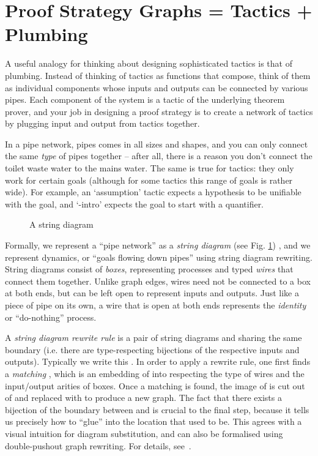 \documentclass{llncs}
\begin{document}
\beforesection
\section{Proof Strategy Graphs = Tactics + Plumbing}\label{sec:psgraph}
\aftersection

A useful analogy for thinking about designing sophisticated tactics is that of plumbing. Instead of thinking of tactics as functions that compose, think of them as individual components whose inputs and outputs can be connected by various pipes. Each component of the system is a tactic of the underlying theorem prover, and your job in designing a proof strategy is to create a network of tactics by plugging input and output from tactics together.

In a pipe network, pipes comes in all sizes and shapes, and you can only connect the same \emph{type} of pipes together -- after all, there is a reason you don't connect the toilet waste water to the mains water. The same is true for tactics: they only work for certain goals (although for some tactics this range of goals is rather wide). For example, an `assumption' tactic expects a hypothesis to be unifiable with the goal, and `-intro' expects the goal to start with a  quantifier. 

\begin{figure}\centering
  \vspace{-12pt}
  \caption{A string diagram}\label{fig:string-diagram}
  \vspace{-14pt}
\end{figure}

Formally, we represent a ``pipe network'' as a \textit{string diagram} (see Fig. \ref{fig:string-diagram}) \cite{paper:Dixon:10}, and we represent dynamics, or ``goals flowing down pipes'' using string diagram rewriting. String diagrams consist of \textit{boxes}, representing processes and typed \textit{wires} that connect them together. Unlike graph edges, wires need not be connected to a box at both ends, but can be left open to represent inputs and outputs. Just like a piece of pipe on its own, a wire that is open at both ends represents the \textit{identity} or ``do-nothing'' process.

A \textit{string diagram rewrite rule} is a pair of string diagrams  and  sharing the same boundary (i.e. there are type-respecting bijections of the respective inputs and outputs). Typically we write this . In order to apply a rewrite rule, one first finds a \textit{matching} , which is an embedding of  into  respecting the type of wires and the input/output arities of boxes. Once a matching is found, the image of  is cut out of  and replaced with  to produce a new graph. The fact that there exists a bijection of the boundary between  and  is crucial to the final step, because it tells us precisely how to ``glue''  into the location that  used to be. This agrees with a visual intuition for diagram substitution, and can also be formalised using double-pushout graph rewriting. For details, see~\cite{paper:Dixon:10}.
\end{document}
